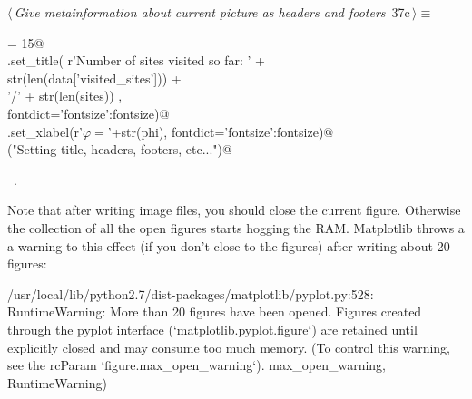 \documentclass[11.5pt]{report}
\newenvironment{CVerbatim}
 {\singlespacing\center\BVerbatim}
 {\endBVerbatim\endcenter}
\begin{document}
\begin{flushleft} \small\label{scrap49}\raggedright\small
{} $\langle\,${\itshape Give metainformation about current picture as headers and footers}\nobreak\ {\footnotesize {37c}}$\,\rangle\equiv$
\vspace{-1ex}
\begin{list}{}{} \item
\mbox{}\verb@fontsize = 15@\\
\mbox{}\verb@ax.set_title( r'Number of sites visited so far: ' +\@\\
\mbox{}\verb@               str(len(data['visited_sites']))   +\@\\
\mbox{}\verb@               '/' + str(len(sites))           ,  \@\\
\mbox{}\verb@                    fontdict={'fontsize':fontsize})@\\
\mbox{}\verb@ax.set_xlabel(r'$\varphi=$'+str(phi), fontdict={'fontsize':fontsize})@\\
\mbox{}\verb@debug("Setting title, headers, footers, etc...")@\\
\mbox{}\verb@@{\NWsep}
\end{list}
\vspace{-1.5ex}
\footnotesize
\begin{list}{}{\setlength{\itemsep}{-\parsep}\setlength{\itemindent}{-\leftmargin}}
\item \NWtxtMacroRefIn\ .

\item{}
\end{list}
\vspace{4ex}
\end{flushleft}

\vspace{-0.8cm}
Note that after writing image files, you should close the current figure. Otherwise
the collection of all the open figures starts hogging the RAM. Matplotlib throws a
a warning to this effect (if you don't close to the figures) after writing about 
20 figures:

\begin{CVerbatim}[fontsize=\small]
/usr/local/lib/python2.7/dist-packages/matplotlib/pyplot.py:528: RuntimeWarning: 
More than 20 figures have been opened. Figures created through the pyplot interface 
(`matplotlib.pyplot.figure`) are retained until explicitly closed and may consume 
too much memory. (To control this warning, see the rcParam `figure.max_open_warning`).
max_open_warning, RuntimeWarning)
\end{CVerbatim}
\end{document}
